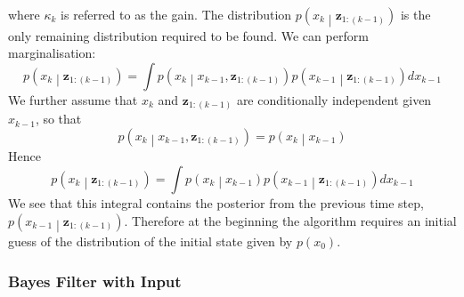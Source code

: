 \documentclass[11pt]{report} %
\begin{document}
where $\kappa_{k}$ is referred to as the gain. The distribution $p\left(x_{k}\middle|\mathbf{z}_{1:\left(k - 1\right)}\right)$ is the only remaining distribution required to be found. We can perform marginalisation:
\begin{equation}
p\left(x_{k}\middle|\mathbf{z}_{1:\left(k - 1\right)}\right) = \int p\left(x_{k}\middle|x_{k - 1}, \mathbf{z}_{1:\left(k - 1\right)}\right)p\left(x_{k - 1}\middle|\mathbf{z}_{1:\left(k - 1\right)}\right)dx_{k - 1}
\end{equation}
We further assume that $x_{k}$ and $\mathbf{z}_{1:\left(k - 1\right)}$ are conditionally independent given $x_{k - 1}$, so that
\begin{equation}
p\left(x_{k}\middle|x_{k - 1}, \mathbf{z}_{1:\left(k - 1\right)}\right) = p\left(x_{k}\middle|x_{k - 1}\right)
\end{equation}
Hence
\begin{equation}
p\left(x_{k}\middle|\mathbf{z}_{1:\left(k - 1\right)}\right) = \int p\left(x_{k}\middle|x_{k - 1}\right)p\left(x_{k - 1}\middle|\mathbf{z}_{1:\left(k - 1\right)}\right)dx_{k - 1}
\end{equation}
We see that this integral contains the posterior from the previous time step, $p\left(x_{k - 1}\middle|\mathbf{z}_{1:\left(k - 1\right)}\right)$. Therefore at the beginning the algorithm requires an initial guess of the distribution of the initial state given by $p\left(x_{0}\right)$. 

\subsubsection{Bayes Filter with Input}
\end{document}
